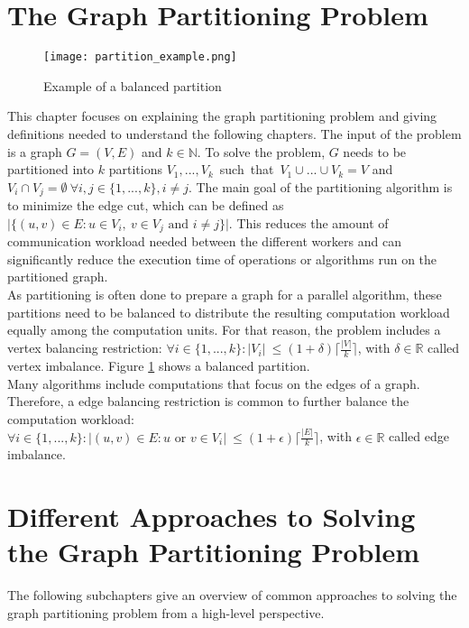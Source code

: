 \documentclass[acmsmall,nonacm,screen,review]{acmart}
\begin{document}
\section{The Graph Partitioning Problem}
\begin{figure}[t]
\centering
\caption{Example of a balanced partition}
\label{partition}
\texttt{[image: partition\_example.png]}
\end{figure}
This chapter focuses on explaining the graph partitioning problem and giving definitions needed to understand the following chapters. The input of the problem is a graph $G = (V,E)$ and $k\in \mathbb{N}$. To solve the problem, $G$ needs to be partitioned into $k$ partitions \hbox{$V_{1},...,V_{k}$ such that $V_{1}\cup...\cup V_{k} = V$} and $V_{i}\cap V_{j} = \emptyset\ \forall i,j\in \{1,...,k\}, i \neq j$. The main goal of the partitioning algorithm is to minimize the edge cut, which can be defined as $\vert \{(u,v)\in E : u\in V_{i},\ v\in V_{j} \text{ and } i\neq j \}\vert$. This reduces the amount of communication workload needed between the different workers and can significantly reduce the execution time of operations or algorithms run on the partitioned graph.  \\
As partitioning is often done to prepare a graph for a parallel algorithm, these partitions need to be balanced to distribute the resulting computation workload equally among the computation units. For that reason, the problem includes a vertex balancing restriction: $\forall i\in \{1,...,k\} : \vert V_{i}\vert \ \leq (1 + \delta) \lceil \frac{\vert V \vert }{k} \rceil $, with $\delta \in \mathbb{R}$ called vertex imbalance. Figure \ref{partition} shows a balanced partition. \\
Many algorithms include computations that focus on the edges of a graph. Therefore, a edge balancing restriction is common to further balance the computation workload: \\ $\forall i\in \{1,...,k\} : \vert (u,v)\in E : u \text{ or } v \in V_{i} \vert \ \leq (1 + \epsilon) \lceil \frac{\vert E \vert }{k} \rceil $, with $\epsilon \in \mathbb{R}$ called edge imbalance.
\section{Different Approaches to Solving the Graph Partitioning Problem}
The following subchapters give an overview of common approaches to solving the graph partitioning problem from a high-level perspective.
\end{document}
